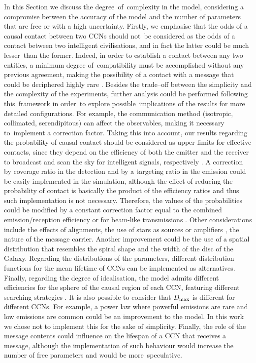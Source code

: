 \documentclass[crop]{CSLB}
\newcommand{\ceti}{CCN}
\newcommand{\cetis}{CCNs}
\begin{document}
In this Section we discuss the degree of complexity in the model, considering a compromise between the accuracy of the
model and the number of parameters that are free or with a high uncertainty.
%
Firstly, we emphasise that the odds of a causal contact between two \cetis{} should not be considered as the odds of a
contact between two intelligent civilisations, and in fact the latter could be much lesser than the former.
%
Indeed, in order to establish a contact between any two entities, a minimum degree of compatibility must be accomplished
without any previous agreement, making the possibility of a contact with a message that could be deciphered highly rare
\citep[see e.g. ][]{forgan_collimated_2014}.
%
Besides the trade--off between the simplicity and the complexity of the experiments, further analysis could be performed
following this framework in order to explore possible implications of the results for more detailed configurations.
%
For example, the communication method (isotropic, collimated, serendipitous) can affect the observables, making it
necessary to implement a correction factor.
%
Taking this into account, our results regarding the probability of causal contact should be considered as upper limits
for effective contacts, since they depend on the efficiency of both the emitter and the receiver to broadcast and scan
the sky for intelligent signals, respectively \citep{grimaldi_signal_2017}.
%
A correction by coverage ratio in the detection and by a targeting ratio in the emission could be easily implemented in
the simulation, although the effect of reducing the probability of contact is basically the product of the efficiency
ratios and thus such implementation is not necessary.
%
Therefore, the values of the probabilities could be modified by a constant correction factor equal to the combined
emission/reception efficiency \citep{smith_broadcasting_2009, anchordoqui_upper_2019, forgan_collimated_2014} or for
beam-like transmissions \citep{grimaldi_signal_2017}. 
%
Other considerations include the effects of alignments, the use of stars as sources or amplifiers \citep{Edmondson2003,
borra_searching_2012}, the nature of the message carrier.
%
Another improvement could be the use of a spatial distribution that resembles the spiral shape and the width of the disc
of the Galaxy.
%
Regarding the distributions of the parameters, different distribution functions for the mean lifetime of \cetis{} can be
implemented as alternatives.
%
Finally, regarding the degree of idealisation, the model admits different efficiencies for the sphere of the causal
region of each \ceti{}, featuring different searching strategies \citep{hippke_interstellar_2017}. 
%
It is also possible to consider that $D_{\rm max}$ is different for different \cetis{}.
%
For example, a power law where powerful emissions are rare and low emissions are common could be an improvement to the
model.
%
In this work we chose not to implement this for the sake of simplicity.
%
Finally, the role of the message contents could influence on the lifespan of a \ceti{} that receives a message, although
the implementation of such behaviour would increase the number of free parameters and would be more speculative.     
\end{document}
